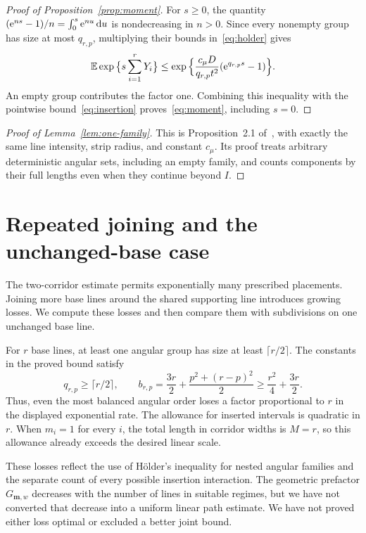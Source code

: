 \documentclass[11pt,letterpaper]{article}
\begin{document}
\begin{proof}[Proof of Proposition~\ref{prop:moment}]
For $s\ge0$, the quantity $(\mathrm{e}^{ns}-1)/n=\int_0^s\mathrm{e}^{nu}\,\mathrm{d} u$ is nondecreasing in $n>0$. Since every nonempty group has size at most $q_{r,p}$, multiplying their bounds in~\eqref{eq:holder} gives
\begin{equation}\label{eq:combine}
 \mathbb E\exp\big\{s\sum_{i=1}^rY_i\big\}
 \le\exp\Big\{\frac{c_\mu D}{q_{r,p}t^2}
                          (\mathrm{e}^{q_{r,p}s}-1)\Big\}.
\end{equation}
An empty group contributes the factor one. Combining this inequality with the pointwise bound~\eqref{eq:insertion} proves~\eqref{eq:moment}, including $s=0$.
\end{proof}

\begin{proof}[Proof of Lemma~\ref{lem:one-family}]
This is Proposition~2.1 of~\cite{CR26}, with exactly the same line intensity, strip radius, and constant $c_\mu$. Its proof treats arbitrary deterministic angular sets, including an empty family, and counts components by their full lengths even when they continue beyond $I$.
\end{proof}

\section{Repeated joining and the unchanged-base case}

The two-corridor estimate permits exponentially many prescribed placements. Joining more base lines around the shared supporting line introduces growing losses. We compute these losses and then compare them with subdivisions on one unchanged base line.

For $r$ base lines, at least one angular group has size at least $\lceil r/2\rceil$. The constants in the proved bound satisfy
\begin{equation}\label{eq:losses}
 q_{r,p}\ge\lceil r/2\rceil,\qquad
 b_{r,p}=\frac{3r}{2}+\frac{p^2+(r-p)^2}{2}
          \ge\frac{r^2}{4}+\frac{3r}{2}.
\end{equation}
Thus, even the most balanced angular order loses a factor proportional to $r$ in the displayed exponential rate. The allowance for inserted intervals is quadratic in $r$. When $m_i=1$ for every $i$, the total length in corridor widths is $M=r$, so this allowance already exceeds the desired linear scale.

These losses reflect the use of H\"older's inequality for nested angular families and the separate count of every possible insertion interaction. The geometric prefactor $G_{\boldsymbol m,w}$ decreases with the number of lines in suitable regimes, but we have not converted that decrease into a uniform linear path estimate. We have not proved either loss optimal or excluded a better joint bound.
\end{document}
